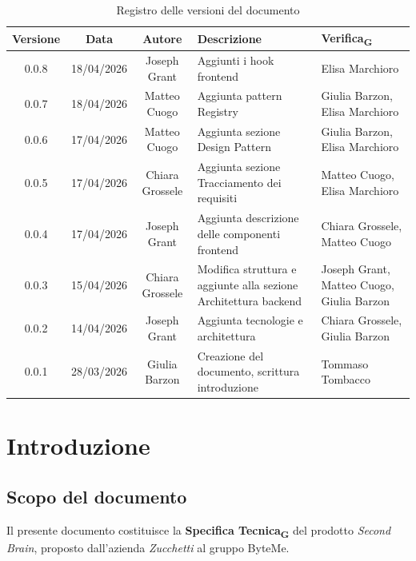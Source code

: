 \documentclass[11pt,a4paper]{article}
\newcommand{\gls}[1]{#1\textsubscript{G}}
\begin{document}
\begin{table}[H]
    \centering          
    \begin{tabular}{|c|c|c|>{\raggedright\arraybackslash}p{}|p{}|}
        \hline
        \textbf{Versione} & \textbf{Data} & \textbf{Autore} & \textbf{Descrizione} & \textbf{\gls{Verifica}} \\
        \hline
        0.0.8 & 18/04/2026 & Joseph Grant & Aggiunti i hook frontend & Elisa Marchioro\\
        \hline
        0.0.7 & 18/04/2026 & Matteo Cuogo & Aggiunta pattern Registry & Giulia Barzon, Elisa Marchioro\\
        \hline
        0.0.6 & 17/04/2026 & Matteo Cuogo & Aggiunta sezione Design Pattern & Giulia Barzon, Elisa Marchioro\\
        \hline
        0.0.5 & 17/04/2026 & Chiara Grossele & Aggiunta sezione Tracciamento dei requisiti & Matteo Cuogo, Elisa Marchioro\\
        \hline
        0.0.4 & 17/04/2026 & Joseph Grant & Aggiunta descrizione delle componenti frontend & Chiara Grossele, Matteo Cuogo\\
        \hline
        0.0.3 & 15/04/2026 & Chiara Grossele & Modifica struttura e aggiunte alla sezione Architettura backend & Joseph Grant, Matteo Cuogo, Giulia Barzon \\
        \hline
        0.0.2 & 14/04/2026 & Joseph Grant & Aggiunta tecnologie e architettura & Chiara Grossele, Giulia Barzon\\
        \hline
        0.0.1 & 28/03/2026 & Giulia Barzon & Creazione del documento, scrittura introduzione & Tommaso Tombacco \\
        \hline
    \end{tabular}
    \caption{Registro delle versioni del documento}
    \label{tab:versionamento}
\end{table}
\newpage

\tableofcontents
\thispagestyle{empty}
\newpage

\setcounter{page}{1}

\section{Introduzione}
\subsection{Scopo del documento}
Il presente documento costituisce la \textbf{\gls{Specifica Tecnica}} del prodotto
\textit{Second Brain}, proposto dall'azienda \textit{Zucchetti} al
gruppo ByteMe.
 
\end{document}
